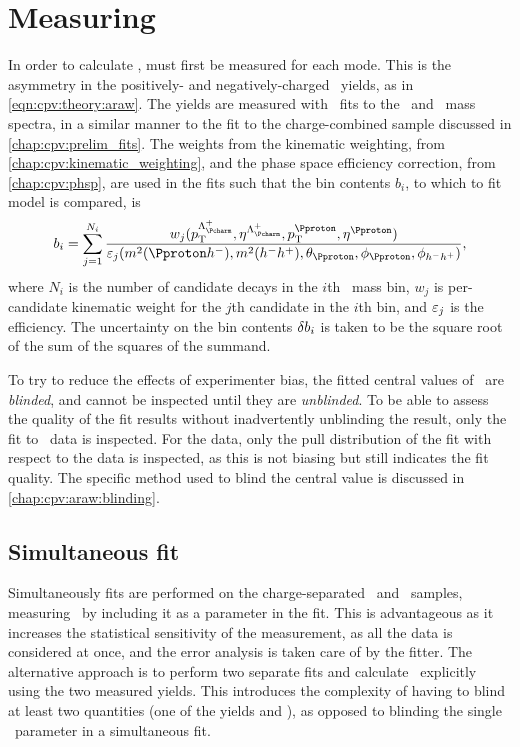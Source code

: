 \chapter{Measuring \texorpdfstring{\ARaw}{ARaw}}
\label{chap:cpv:araw}

In order to calculate \dACP, \ARaw must first be measured for each mode.
This is the asymmetry in the positively- and negatively-charged \PLambdac\ 
yields, as in \cref{eqn:cpv:theory:araw}.
The yields are measured with \chisq\ fits to the \PLambdac\ and \APLambdac\ 
mass spectra, in a similar manner to the fit to the charge-combined sample 
discussed in \cref{chap:cpv:prelim_fits}.
The weights from the kinematic weighting, from 
\cref{chap:cpv:kinematic_weighting}, and the phase space efficiency correction, 
from \cref{chap:cpv:phsp}, are used in the fits such that the bin contents 
$b_{i}$, to which to fit model is compared, is
\begin{equation}
  b_{i} = \sum_{j = 1}^{N_{i}} \frac{%
    w_{j}(\pT^{\PLambdac}, \Eta^{\PLambdac},
          \pT^{\Pproton}, \Eta^{\Pproton})
  }{%
    \eff_{j}(\msqphm, \msqhh, \thetap, \phip, \phihh)
  },
\end{equation}
where $N_{i}$ is the number of candidate decays in the $i$th \phh\ mass bin, 
$w_{j}$ is per-candidate kinematic weight for the $j$th candidate in the $i$th 
bin, and $\varepsilon_{j}$ is the efficiency.
The uncertainty on the bin contents $\delta{b_{i}}$ is taken to be the square 
root of the sum of the squares of the summand.

To try to reduce the effects of experimenter bias, the fitted central values of 
\ARaw\ are \emph{blinded}, and cannot be inspected until they are 
\emph{unblinded}.
To be able to assess the quality of the fit results without inadvertently 
unblinding the result, only the fit to \PLambdac\ data is inspected.
For the \APLambdac data, only the pull distribution of the fit with respect to 
the data is inspected, as this is not biasing but still indicates the fit 
quality.
The specific method used to blind the central value is discussed in 
\cref{chap:cpv:araw:blinding}.

\section{Simultaneous fit}
\label{chap:cpv:araw:simultaneous_fit}

Simultaneously fits are performed on the charge-separated \PLambdac\ and 
\APLambdac\ samples, measuring \ARaw\ by including it as a parameter in the 
fit.
This is advantageous as it increases the statistical sensitivity of the 
measurement, as all the data is considered at once, and the error analysis is 
taken care of by the fitter.
The alternative approach is to perform two separate fits and calculate \ARaw\ 
explicitly using the two measured yields.
This introduces the complexity of having to blind at least two quantities (one 
of the yields and \ARaw), as opposed to blinding the single \ARaw\ parameter in 
a simultaneous fit.

